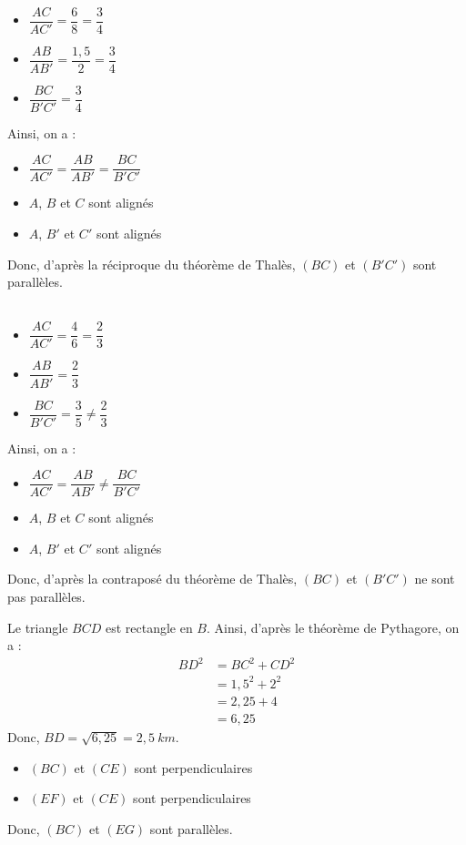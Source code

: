 \begin{multicols}{2}
  \cnt\\
  \begin{itemize}
    \item $\dfrac{AC}{AC'}=\dfrac{6}{8}=\dfrac{3}{4}$
    \item $\dfrac{AB}{AB'}=\dfrac{1,5}{2}=\dfrac{3}{4}$
    \item $\dfrac{BC}{B'C'}=\dfrac{3}{4}$
  \end{itemize}
  Ainsi, on a :
  \begin{itemize}
    \item $\dfrac{AC}{AC'}=\dfrac{AB}{AB'}=\dfrac{BC}{B'C'}$
    \item $A$, $B$ et $C$ sont alignés
    \item $A$, $B'$ et $C'$ sont alignés
  \end{itemize}
  Donc, d'après la réciproque du théorème de Thalès, $(BC)$ et $(B'C')$ sont parallèles.
  \columnbreak\\
  \cnt\\
  \begin{itemize}
    \item $\dfrac{AC}{AC'}=\dfrac{4}{6}=\dfrac{2}{3}$
    \item $\dfrac{AB}{AB'}=\dfrac{2}{3}$
    \item $\dfrac{BC}{B'C'}=\dfrac{3}{5}\neq\dfrac{2}{3}$
  \end{itemize}
  Ainsi, on a :
  \begin{itemize}
    \item $\dfrac{AC}{AC'}=\dfrac{AB}{AB'}\neq\dfrac{BC}{B'C'}$
    \item $A$, $B$ et $C$ sont alignés
    \item $A$, $B'$ et $C'$ sont alignés
  \end{itemize}
  Donc, d'après la contraposé du théorème de Thalès, $(BC)$ et $(B'C')$ ne sont pas parallèles.
\end{multicols}


\begin{multicols}{2}
  \cnt Le triangle $BCD$ est rectangle en $B$. Ainsi, d'après le théorème de Pythagore, on a :
  \begin{align*}
    BD^2&=BC^2+CD^2\\
    &=1,5^2+2^2\\
    &=2,25+4\\
    &=6,25
  \end{align*}
  Donc, $BD=\sqrt{6,25}=2,5~km$.
  \columnbreak

  \cnt
  \begin{itemize}
    \item $(BC)$ et $(CE)$ sont perpendiculaires
    \item $(EF)$ et $(CE)$ sont perpendiculaires
  \end{itemize}
  Donc, $(BC)$ et $(EG)$ sont parallèles.
\end{multicols}

